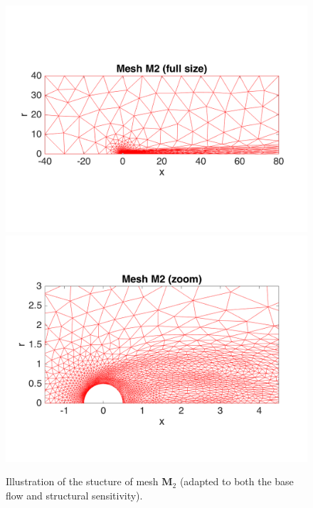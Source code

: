 \documentclass[twocolumn,10pt]{asme2ej}
\begin{document}
\begin{figure}
\vspace{-.5cm}\vspace{-.5cm}
\includegraphics[width = .9\linewidth]{Cylinder_Mesh2_Full.png}
\vspace{-.5cm}\vspace{-.5cm}
\includegraphics[width = .9\linewidth]{Cylinder_Mesh2.png}
\caption{Illustration of the stucture of mesh  $\mathbf{M}_2$ (adapted to both the base flow and structural sensitivity).}
\label{fig:mesh2}
\end{figure}
\end{document}
